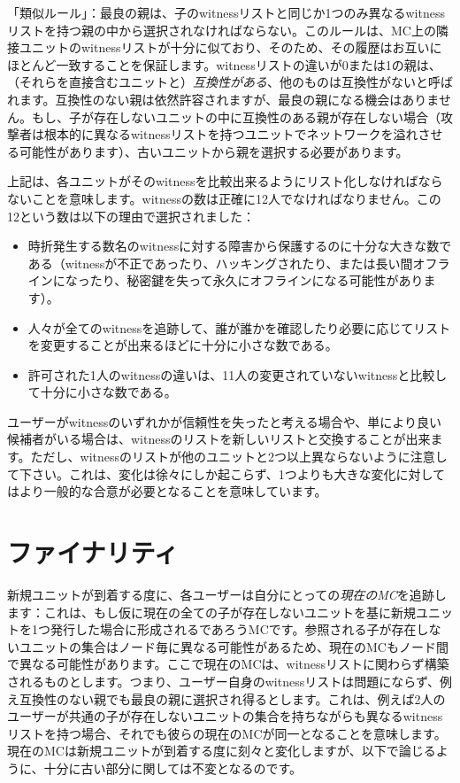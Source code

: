 \documentclass[a4paper, dvipdfmx]{jsarticle}
\begin{document}
「類似ルール」：最良の親は、子のwitnessリストと同じか1つのみ異なるwitnessリストを持つ親の中から選択されなければならない。このルールは、MC上の隣接ユニットのwitnessリストが十分に似ており、そのため、その履歴はお互いにほとんど一致することを保証します。witnessリストの違いが0または1の親は、（それらを直接含むユニットと）\emph{互換性がある}、他のものは互換性がないと呼ばれます。互換性のない親は依然許容されますが、最良の親になる機会はありません。もし、子が存在しないユニットの中に互換性のある親が存在しない場合（攻撃者は根本的に異なるwitnessリストを持つユニットでネットワークを溢れさせる可能性があります）、古いユニットから親を選択する必要があります。

上記は、各ユニットがそのwitnessを比較出来るようにリスト化しなければならないことを意味します。witnessの数は正確に12人でなければなりません。この12という数は以下の理由で選択されました：

\begin{itemize}
    \item 時折発生する数名のwitnessに対する障害から保護するのに十分な大きな数である（witnessが不正であったり、ハッキングされたり、または長い間オフラインになったり、秘密鍵を失って永久にオフラインになる可能性があります）。
    \item 人々が全てのwitnessを追跡して、誰が誰かを確認したり必要に応じてリストを変更することが出来るほどに十分に小さな数である。
    \item 許可された1人のwitnessの違いは、11人の変更されていないwitnessと比較して十分に小さな数である。
\end{itemize}

ユーザーがwitnessのいずれかが信頼性を失ったと考える場合や、単により良い候補者がいる場合は、witnessのリストを新しいリストと交換することが出来ます。ただし、witnessのリストが他のユニットと2つ以上異ならないように注意して下さい。これは、変化は徐々にしか起こらず、1つよりも大きな変化に対してはより一般的な合意が必要となることを意味しています。

\section{ファイナリティ}
新規ユニットが到着する度に、各ユーザーは自分にとっての\emph{現在のMC}を追跡します：これは、もし仮に現在の全ての子が存在しないユニットを基に新規ユニットを1つ発行した場合に形成されるであろうMCです。参照される子が存在しないユニットの集合はノード毎に異なる可能性があるため、現在のMCもノード間で異なる可能性があります。ここで現在のMCは、witnessリストに関わらず構築されるものとします。つまり、ユーザー自身のwitnessリストは問題にならず、例え互換性のない親でも最良の親に選択され得るとします。これは、例えば2人のユーザーが共通の子が存在しないユニットの集合を持ちながらも異なるwitnessリストを持つ場合、それでも彼らの現在のMCが同一となることを意味します。現在のMCは新規ユニットが到着する度に刻々と変化しますが、以下で論じるように、十分に古い部分に関しては不変となるのです。
\end{document}
